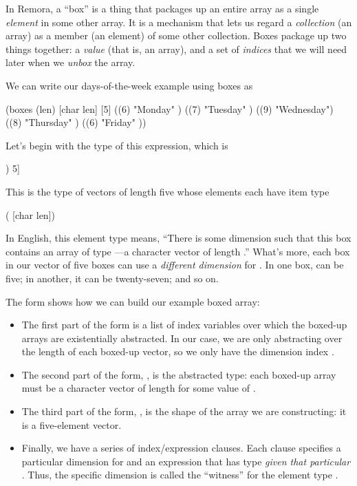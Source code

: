In Remora, a ``box'' is a thing that packages up an entire array as a single 
\emph{element} in some other array.
It is a mechanism that lets us regard a \emph{collection} (an array)
as a member (an element) of some other collection.
Boxes package up two things together:
a \emph{value} (that is, an array),
and a set of \emph{indices} that we will need later
when we \emph{unbox} the array.

We can write our days-of-the-week example using boxes as
\begin{code}
(boxes (len) [char len] [5]
  ((6) "Monday"   )
  ((7) "Tuesday"  )
  ((9) "Wednesday")
  ((8) "Thursday" )
  ((6) "Friday"   ))\end{code}
Let's begin with the type of this expression, which is
\begin{code}
[(\boxtype{len} [char len]) 5]\end{code}
This is the type of vectors of length five whose elements
each have item type
\begin{code}
( [char len])\end{code}
In English, this element type means,
``There is some dimension  such that this box contains
  an array of type ---a character vector of length
  .''
What's more,
each box in our vector of five boxes can use a \emph{different dimension} for
.
In one box,  can be five; in another, it can be twenty-seven; and so on.

The  form shows how we can build our example boxed array:
\begin{itemize}
\item The first part of the  form is a list of index variables
over which the boxed-up arrays are existentially abstracted.
In our case, we are only abstracting over the length of each boxed-up
vector, so we only have the dimension index .

\item The second part of the form, , is the abstracted type:
each boxed-up array must be a character vector of length
 for some value of .

\item The third part of the form, \ex{[5]}, is the shape of the array
we are constructing: it is a five-element vector.

\item Finally, we have a series of index/expression clauses.
Each clause specifies a particular dimension for 
and an expression that has type 
\emph{given that particular }.
Thus, the specific dimension is called the ``witness'' for the
element type .
\end{itemize}

